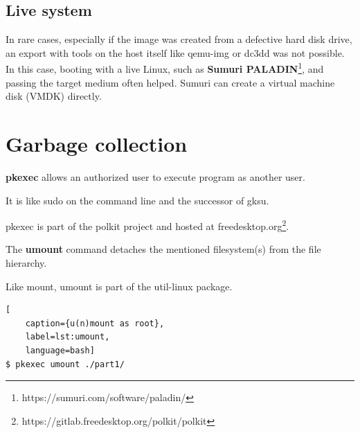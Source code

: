 \subsection{Live system}

In rare cases, especially if the image was created from a defective hard disk drive, an export with tools on the host itself like qemu-img or dc3dd was not possible.
In this case, booting with a live Linux, such as \textbf{Sumuri PALADIN}\footnote{https://sumuri.com/software/paladin/}, and passing the target medium often helped. Sumuri can create a virtual machine disk (VMDK) directly.

\section{Garbage collection}

\textbf{pkexec} allows an authorized user to execute program as another user.

It is like sudo on the command line and the successor of gksu.

pkexec is part of the polkit project and hosted at freedesktop.org\footnote{https://gitlab.freedesktop.org/polkit/polkit}.

The \textbf{umount} command detaches the mentioned filesystem(s) from the file hierarchy.

Like mount, umount is part of the util-linux package.

\begin{lstlisting}[
    caption={u(n)mount as root},
    label=lst:umount,
    language=bash]
$ pkexec umount ./part1/
\end{lstlisting}
